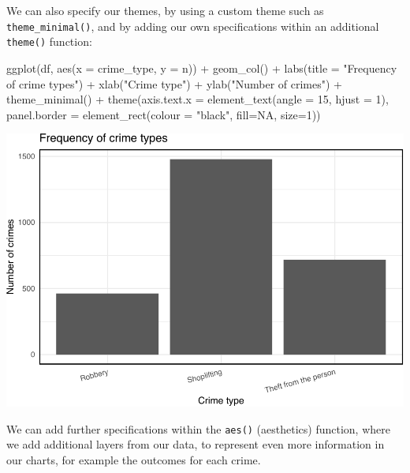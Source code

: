 \documentclass[
  krantz2]{krantz}
\makeatletter
\newenvironment{Shaded}{\begin{snugshade}}{\end{snugshade}}
\newcommand{\AttributeTok}[1]{\textcolor[rgb]{0.61,0.61,0.61}{#1}}
\newcommand{\ConstantTok}[1]{\textcolor[rgb]{0,0,0}{#1}}
\newcommand{\DecValTok}[1]{\textcolor[rgb]{0.06,0.06,0.06}{#1}}
\newcommand{\FunctionTok}[1]{\textcolor[rgb]{0,0,0}{#1}}
\newcommand{\NormalTok}[1]{#1}
\newcommand{\SpecialCharTok}[1]{\textcolor[rgb]{0,0,0}{#1}}
\newcommand{\StringTok}[1]{\textcolor[rgb]{0.5,0.5,0.5}{#1}}
\newenvironment{kframe}{%
\medskip{}
\setlength{\fboxsep}{.8em}
 \def\at@end@of@kframe{}%
 \ifinner\ifhmode%
  \def\at@end@of@kframe{\end{minipage}}%
  \begin{minipage}{\columnwidth}%
 \fi\fi%
 \def\FrameCommand##1{\hskip\@totalleftmargin \hskip-\fboxsep
 \colorbox{shadecolor}{##1}\hskip-\fboxsep
     \hskip-\linewidth \hskip-\@totalleftmargin \hskip\columnwidth}%
 \MakeFramed {\advance\hsize-\width
   \@totalleftmargin\z@ \linewidth\hsize
   \@setminipage}}%
 {\par\unskip\endMakeFramed%
 \at@end@of@kframe}
\renewenvironment{Shaded}{\begin{kframe}}{\end{kframe}}
\makeatother
\begin{document}
We can also specify our themes, by using a custom theme such as \texttt{theme\_minimal()}, and by adding our own specifications within an additional \texttt{theme()} function:

\begin{Shaded}
\begin{Highlighting}[]
\FunctionTok{ggplot}\NormalTok{(df, }\FunctionTok{aes}\NormalTok{(}\AttributeTok{x =}\NormalTok{ crime\_type, }\AttributeTok{y =}\NormalTok{ n)) }\SpecialCharTok{+} 
  \FunctionTok{geom\_col}\NormalTok{() }\SpecialCharTok{+} 
  \FunctionTok{labs}\NormalTok{(}\AttributeTok{title =} \StringTok{"Frequency of crime types"}\NormalTok{) }\SpecialCharTok{+} 
  \FunctionTok{xlab}\NormalTok{(}\StringTok{"Crime type"}\NormalTok{) }\SpecialCharTok{+} 
  \FunctionTok{ylab}\NormalTok{(}\StringTok{"Number of crimes"}\NormalTok{) }\SpecialCharTok{+} 
  \FunctionTok{theme\_minimal}\NormalTok{() }\SpecialCharTok{+} 
  \FunctionTok{theme}\NormalTok{(}\AttributeTok{axis.text.x =} \FunctionTok{element\_text}\NormalTok{(}\AttributeTok{angle =} \DecValTok{15}\NormalTok{, }\AttributeTok{hjust =} \DecValTok{1}\NormalTok{), }
        \AttributeTok{panel.border =} \FunctionTok{element\_rect}\NormalTok{(}\AttributeTok{colour =} \StringTok{"black"}\NormalTok{, }\AttributeTok{fill=}\ConstantTok{NA}\NormalTok{, }\AttributeTok{size=}\DecValTok{1}\NormalTok{))}
\end{Highlighting}
\end{Shaded}

\includegraphics{crime_mapping_files/figure-latex/unnamed-chunk-11-1.pdf}

We can add further specifications within the \texttt{aes()} (aesthetics) function, where we add additional layers from our data, to represent even more information in our charts, for example the outcomes for each crime.
\end{document}
